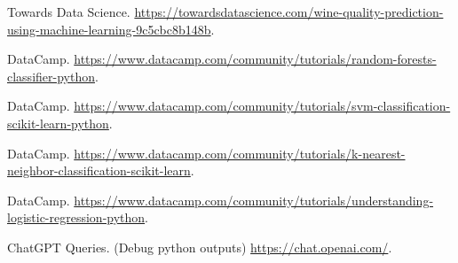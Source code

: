 \documentclass{article}
\begin{document}
\newpage

\begin{thebibliography}{9}

Towards Data Science.
\url{https://towardsdatascience.com/wine-quality-prediction-using-machine-learning-9c5cbc8b148b}.

DataCamp.
\url{https://www.datacamp.com/community/tutorials/random-forests-classifier-python}.

DataCamp.
\url{https://www.datacamp.com/community/tutorials/svm-classification-scikit-learn-python}.

DataCamp.
\url{https://www.datacamp.com/community/tutorials/k-nearest-neighbor-classification-scikit-learn}.

DataCamp.
\url{https://www.datacamp.com/community/tutorials/understanding-logistic-regression-python}.

ChatGPT Queries. (Debug python outputs)
\url{https://chat.openai.com/}.

\end{thebibliography}
\end{document}
